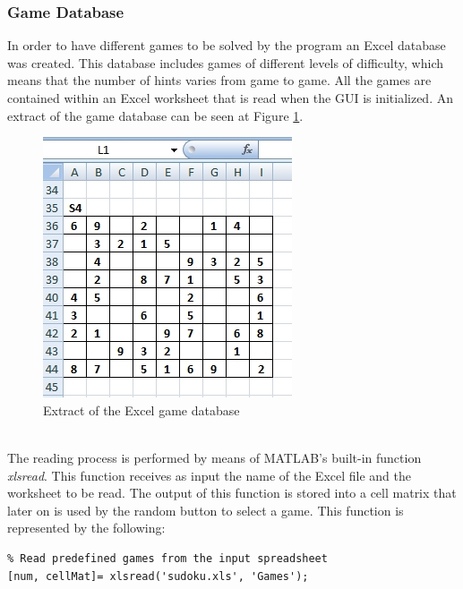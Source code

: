 \documentclass[12pt,a4paper]{article} %
\begin{document}
\subsubsection{Game Database}
In order to have different games to be solved by the program an Excel database was created. This database includes games of different levels of difficulty, which means that the number of hints varies from game to game. All the games are contained within an Excel worksheet that is read when the GUI is initialized. An extract of the game database can be seen at Figure \ref{fig:excel}.
\begin{figure}[h!]
\centering
\includegraphics[scale = 0.6]{pictures/Excel1}
\caption{Extract of the Excel game database}
\label{fig:excel}
\end{figure}
\newline
\\The reading process is performed by means of MATLAB’s built-in function \textit{xlsread}. This function receives as input the name of the Excel file and the worksheet to be read. The output of this function is stored into a cell matrix that later on is used by the random button to select a game. This function is represented by the following:
\begin{verbatim}
% Read predefined games from the input spreadsheet
[num, cellMat]= xlsread('sudoku.xls', 'Games');
\end{verbatim}
\newpage
\end{document}
